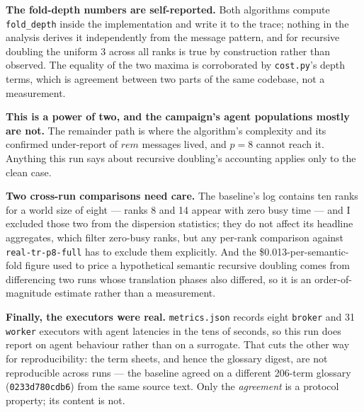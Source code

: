 \documentclass[11pt]{article}
\begin{document}
\textbf{The fold-depth numbers are self-reported.} Both algorithms compute \texttt{fold\_depth}
inside the implementation and write it to the trace; nothing in the analysis derives it
independently from the message pattern, and for recursive doubling the uniform 3 across all ranks
is true by construction rather than observed. The equality of the two maxima is corroborated by
\texttt{cost.py}'s depth terms, which is agreement between two parts of the same codebase, not a
measurement.

\textbf{This is a power of two, and the campaign's agent populations mostly are not.} The remainder
path is where the algorithm's complexity and its confirmed under-report of $\mathit{rem}$ messages
lived, and $p=8$ cannot reach it. Anything this run says about recursive doubling's accounting
applies only to the clean case.

\textbf{Two cross-run comparisons need care.} The baseline's log contains ten ranks for a world size
of eight --- ranks 8 and 14 appear with zero busy time --- and I excluded those two from the
dispersion statistics; they do not affect its headline aggregates, which filter zero-busy ranks,
but any per-rank comparison against \texttt{real-tr-p8-full} has to exclude them explicitly. And
the \$0.013-per-semantic-fold figure used to price a hypothetical semantic recursive doubling comes
from differencing two runs whose translation phases also differed, so it is an order-of-magnitude
estimate rather than a measurement.

\textbf{Finally, the executors were real.} \texttt{metrics.json} records eight \texttt{broker} and
31 \texttt{worker} executors with agent latencies in the tens of seconds, so this run does report
on agent behaviour rather than on a surrogate. That cuts the other way for reproducibility: the
term sheets, and hence the glossary digest, are not reproducible across runs --- the baseline
agreed on a different 206-term glossary (\texttt{0233d780cdb6}) from the same source text. Only the
\emph{agreement} is a protocol property; its content is not.
\end{document}
